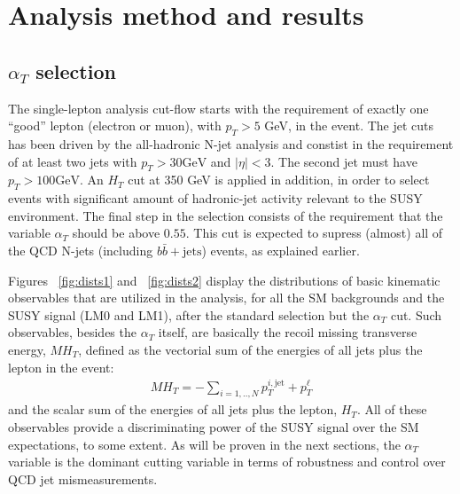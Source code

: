 \section{Analysis method and results}

\subsection{$\alpha_{T}$ selection}

The single-lepton analysis cut-flow starts with the requirement of exactly one ``good'' lepton (electron or muon), with $p_{T} > 5$ GeV, in the event. The jet cuts has been driven by the all-hadronic N-jet analysis and constist in the requirement of at least two jets with $p_{T}>30 \textrm{GeV}$ and $|\eta|<3$. The second jet must have $p_{T}>100 \textrm{GeV}$. An $H_{T}$ cut at 350 GeV is applied in addition, in order to select events with significant amount of hadronic-jet activity relevant to the SUSY environment. The final step in the selection consists of the requirement that the variable $\alpha_{T}$ should be above $0.55$. This cut is expected to supress (almost) all of the QCD N-jets (including $b\bar{b} + \textrm{jets}$) events, as explained earlier.

Figures ~\ref{fig:dists1} and ~\ref{fig:dists2} display the distributions of basic kinematic observables that are utilized in the analysis, for all the SM backgrounds and the SUSY signal (LM0 and LM1), after the standard selection but the $\alpha_{T}$ cut. Such observables, besides the $\alpha_{T}$ itself, are basically the recoil missing transverse energy, $MH_{T}$, defined as the vectorial sum of the energies of all jets plus the lepton in the event:
\begin{eqnarray}
MH_{T}= - \sum_{i = 1,..,N} p_{T}^{i , \textrm{jet}} + p_{T}^{\ell}
\end{eqnarray} 
and the scalar sum of the energies of all jets plus the lepton, $H_{T}$. All of these observables provide a discriminating power of the SUSY signal over the SM expectations, to some extent. As will be proven in the next sections, the $\alpha_{T}$ variable is the dominant cutting variable in terms of robustness and control over QCD jet mismeasurements.

